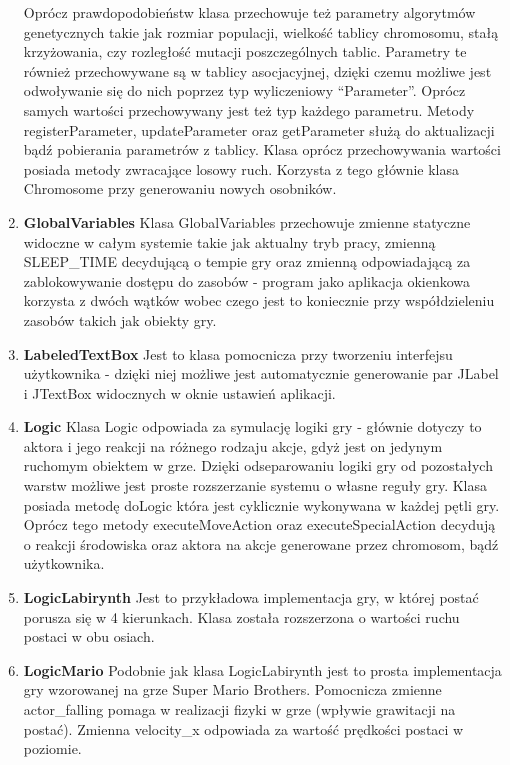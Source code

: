 \begin{par}
\begin{enumerate}
	Oprócz prawdopodobieństw klasa przechowuje też parametry algorytmów genetycznych takie jak rozmiar populacji, wielkość tablicy chromosomu, stałą krzyżowania, czy rozległość mutacji poszczególnych tablic. Parametry te również przechowywane są w tablicy asocjacyjnej, dzięki czemu możliwe jest odwoływanie się do nich poprzez typ wyliczeniowy ``Parameter''.
	Oprócz samych wartości przechowywany jest też typ każdego parametru. Metody registerParameter, updateParameter oraz getParameter służą do aktualizacji bądź pobierania parametrów z tablicy. Klasa oprócz przechowywania wartości posiada metody zwracające losowy ruch. Korzysta z tego głównie klasa Chromosome przy generowaniu nowych osobników.
	\item{\bf GlobalVariables }\newline
	Klasa GlobalVariables przechowuje zmienne statyczne widoczne w całym systemie takie jak aktualny tryb pracy, zmienną SLEEP\_TIME decydującą o tempie gry oraz zmienną odpowiadającą za zablokowywanie dostępu do zasobów - program jako aplikacja okienkowa korzysta z dwóch wątków wobec czego jest to koniecznie przy współdzieleniu zasobów takich jak obiekty gry.
	\item{\bf LabeledTextBox }\newline
	Jest to klasa pomocnicza przy tworzeniu interfejsu użytkownika - dzięki niej możliwe jest automatycznie generowanie par JLabel i JTextBox widocznych w oknie ustawień aplikacji.
	\item{\bf Logic }\newline
	Klasa Logic odpowiada za symulację logiki gry - głównie dotyczy to aktora i jego reakcji na różnego rodzaju akcje, gdyż jest on jedynym ruchomym obiektem w grze. Dzięki odseparowaniu logiki gry od pozostałych warstw możliwe jest proste rozszerzanie systemu o własne reguły gry. Klasa posiada metodę doLogic która jest cyklicznie wykonywana w każdej pętli gry. Oprócz tego metody executeMoveAction oraz executeSpecialAction decydują o reakcji środowiska oraz aktora na akcje generowane przez chromosom, bądź użytkownika.
	\item{\bf LogicLabirynth }\newline
	Jest to przykładowa implementacja gry, w której postać porusza się w 4 kierunkach. Klasa została rozszerzona o wartości ruchu postaci w obu osiach.
	\item{\bf LogicMario }\newline
	Podobnie jak klasa LogicLabirynth jest to prosta implementacja gry wzorowanej na grze Super Mario Brothers. Pomocnicza zmienne actor\_falling pomaga w realizacji fizyki w grze (wpływie grawitacji na postać). Zmienna velocity\_x odpowiada za wartość prędkości postaci w poziomie.

\end{enumerate}
\end{par}

